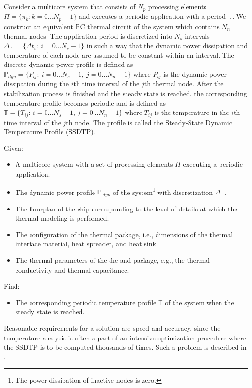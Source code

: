 Consider a multicore system that consists of $N_p$ processing elements $\Pi = \{ \pi_k: k = 0 \dots N_p - 1 \}$ and executes a periodic application with a period $\period$. We construct an equivalent RC thermal circuit of the system which contains $N_n$ thermal nodes. The application period is discretized into $N_s$ intervals \mbox{$\Delta \period = \{ \Delta t_i: \: i = 0 \dots N_s - 1 \}$} in such a way that the dynamic power dissipation and temperature of each node are assumed to be constant within an interval. The discrete dynamic power profile is defined as \mbox{$\mathbb{P}_{dyn} = \{ P_{ij}: \: i = 0 \dots N_s - 1, \: j = 0 \dots N_n - 1 \}$} where $P_{ij}$ is the dynamic power dissipation during the $i$th time interval of the $j$th thermal node. After the stabilization process is finished and the steady state is reached, the corresponding temperature profile becomes periodic and is defined as \mbox{$\mathbb{T} = \{ T_{ij}: \: i = 0 \dots N_s - 1, \: j = 0 \dots N_n - 1 \}$} where $T_{ij}$ is the temperature in the $i$th time interval of the $j$th node. The profile is called the Steady-State Dynamic Temperature Profile (SSDTP).

Given:
\begin{itemize}
  \item A multicore system with a set of processing elements $\Pi$ executing a periodic application.
  \item The dynamic power profile $\mathbb{P}_{\:dyn}$ of the system\footnote{The power dissipation of inactive nodes is zero.} with discretization $\Delta \period$.
  \item The floorplan of the chip corresponding to the level of details at which the thermal modeling is performed.
  \item The configuration of the thermal package, i.e., dimensions of the thermal interface material, heat spreader, and heat sink.
  \item The thermal parameters of the die and package, e.g., the thermal conductivity and thermal capacitance.
\end{itemize}

Find:
\begin{itemize}
  \item The corresponding periodic temperature profile $\mathbb{T}$ of the system when the steady state is reached.
\end{itemize}

Reasonable requirements for a solution are speed and accuracy, since the temperature analysis is often a part of an intensive optimization procedure where the SSDTP is to be computed thousands of times. Such a problem is described in .
